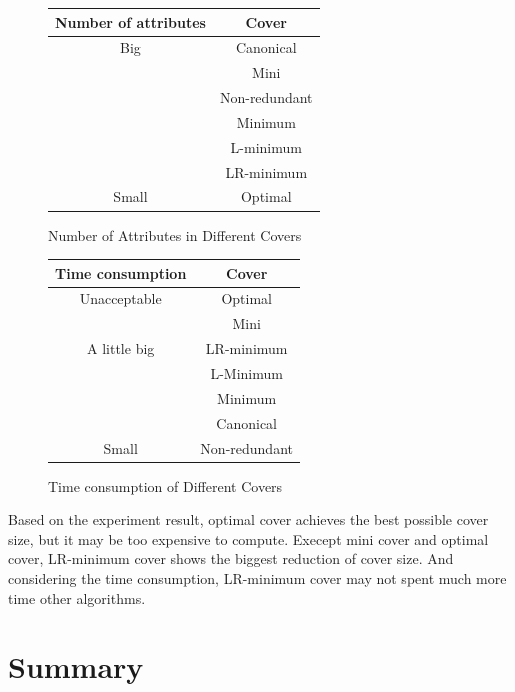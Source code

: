 \documentclass[11pt]{book}
\begin{document}
\begin{figure}[H]
	\begin{minipage}[b]{.45\linewidth}
		\centering	
		\begin{tabular}{ |c|c| }
			\hline
			Number of attributes & Cover \\
			\hline
			Big                  & Canonical \\
		                    	 & Mini      \\
		                	     & Non-redundant \\
		            	         & Minimum \\
		        	             & L-minimum \\
		    	                 & LR-minimum \\
			Small                & Optimal \\
			\hline
		\end{tabular}
		\caption{Number of Attributes in Different Covers}
	\end{minipage}
	\hfill
	\begin{minipage}[b]{.45\linewidth}
		\centering	
		\begin{tabular}{ |c|c| }
			\hline
			Time consumption & Cover \\
			\hline
			Unacceptable    & Optimal \\
		                 	& Mini      \\
		    A little big	& LR-minimum \\
		            	     & L-Minimum \\
		        	         & Minimum \\
		    	             & Canonical \\
			Small            & Non-redundant \\
			\hline
		\end{tabular}
		\caption{Time consumption of Different Covers}
	\end{minipage}	
\end{figure}

Based on the experiment result, optimal cover achieves the best possible cover size, but it may be too expensive to compute. Execept mini cover and optimal cover, LR-minimum cover shows the biggest reduction of cover size. And considering the time consumption, LR-minimum cover may not spent much more time other algorithms.

\section{Summary}
\end{document}
